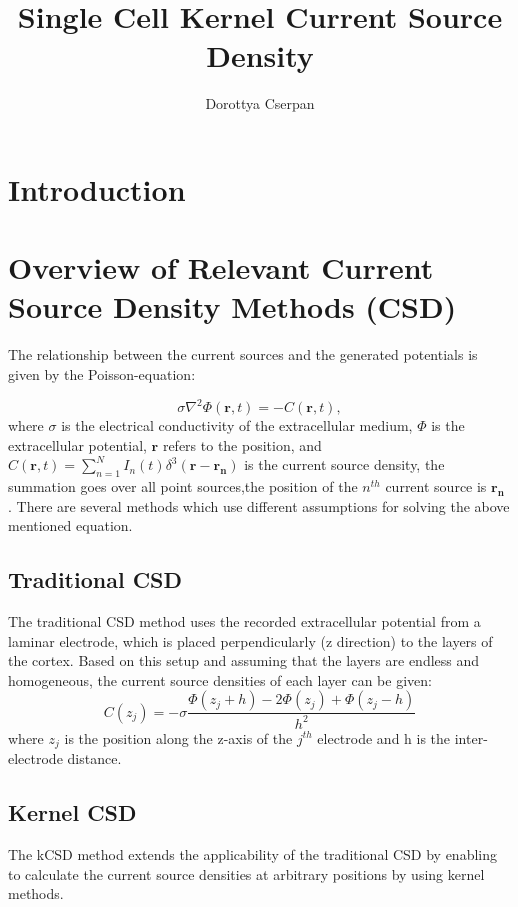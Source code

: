 \documentclass[12pt,a4paper]{article}
\author{Dorottya Cserpan}
\title{Single Cell Kernel Current Source Density}
\begin{document}
\maketitle

\section{Introduction}

\section{Overview of Relevant Current Source Density Methods (CSD)}
The relationship between the current sources and the generated potentials is given by the Poisson-equation:

\begin{equation}
 \sigma \nabla^2 \Phi(\mathbf{r},t )= -C(\mathbf{r},t),
\label{eq:poisson1}
\end{equation} 
where $\sigma$ is the electrical conductivity of the extracellular medium, $\Phi$ is the 
extracellular potential, $\mathbf{r}$ refers to the position, and 
$C(\mathbf{r},t)= \sum_{n=1}^N I_n (t) \delta^3(\mathbf{r}-\mathbf{r_n}) $
 is the current source density, the summation goes over all point sources,the position of the $n^{th}$ current source is $\mathbf{r_n}$ . There are several methods which use different assumptions for solving the above mentioned equation. 

\subsection{Traditional CSD}
The traditional CSD method \cite{Nicholson} uses the recorded extracellular potential from a laminar electrode, which is placed perpendicularly (z direction) to the layers of the cortex. Based on this setup and assuming that the layers are endless and homogeneous, the current source densities of each layer can be given:
\begin{equation}
C(z_j)= - \sigma \frac{\Phi(z_j+h)-2\Phi(z_j)+\Phi(z_j-h)}{h^2}
\end{equation}
 where $z_j$ is the position along the z-axis of the $j^{th}$ electrode and h is the inter-electrode distance.
\subsection{Kernel CSD}
The kCSD method \cite{DanielW} extends the applicability of the traditional CSD by enabling to calculate the current source densities at arbitrary positions by using kernel methods. 
\end{document}
